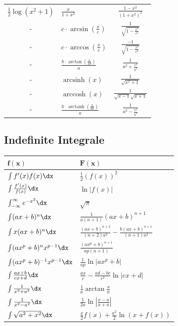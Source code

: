 \begin{flushleft}
\begin{center}
\begin{tabularx}{\linewidth}{c>{\centering\arraybackslash}Xc}
 $\frac{1}{2} \log \left(x^2+1\right)$  & $\frac{x}{1+x^2}$ & $\frac{1-x^2}{\left(1+x^2\right)^2}$
  \\
- &$c\cdot \arcsin(\frac{x}{c})$& $\frac{1}{\sqrt{1-\frac{x^2}{c^2}}}$ \\
- &$c\cdot \arccos(\frac{x}{c})$& $\frac{-1}{\sqrt{1-\frac{x^2}{c^2}}}$ \\
- &$\frac{b\cdot \arctan(\frac{x}{ab})}{a}$& $\frac{1}{a^2+\frac{x^2}{b^2}}$ \\
- &$\operatorname{arcsinh}(x)$& $\frac{1}{\sqrt{x^2 +1}}$ \\
- &$\operatorname{arccosh}(x)$& $\frac{1}{\sqrt{x-1}\sqrt{x+1}}$ \\
- &$\frac{b\cdot \operatorname{arctanh}(\frac{x}{ab})}{a}$& $\frac{1}{a^2-\frac{x^2}{b^2}}$ \\

  \bottomrule
  \end{tabularx}
\end{center}









\subsection{Indefinite Integrale}
\begin{center}
 \begin{tabularx}{\linewidth}{>{\centering\arraybackslash}X>{\centering\arraybackslash}X}
  \toprule
  $\mathbf{f(x)}$ & $\mathbf{F(x)}$ \\
  \midrule
  $\int f'(x) f(x) \dx$ & $\frac{1}{2}(f(x))^2$ \\
  $\int \frac{f'(x)}{f(x)} \dx$ & $\ln|f(x)|$ \\
  $\int_{-\infty}^\infty e^{-x^2} \dx$ & $\sqrt{\pi}$ \\
  $\int (ax+b)^n \dx$ & $\frac{1}{a(n+1)}(ax+b)^{n+1}$ \\
  $\int x(ax+b)^n \dx$ & $\frac{(ax+b)^{n+2}}{(n+2)a^2} - \frac{b(ax+b)^{n+1}}{(n+1)a^2}$ \\
  $\int (ax^p+b)^n x^{p-1} \dx$ & $\frac{(ax^p+b)^{n+1}}{ap(n+1)}$ \\
  $\int (ax^p + b)^{-1} x^{p-1} \dx$ & $\frac{1}{ap} \ln |ax^p + b|$ \\
  $\int \frac{ax+b}{cx+d} \dx$ & $\frac{ax}{c} - \frac{ad-bc}{c^2} \ln |cx +d|$ \\
  $\int \frac{1}{x^2+a^2} \dx$ & $\frac{1}{a} \arctan \frac{x}{a}$ \\
  $\int \frac{1}{x^2 - a^2} \dx$ & $\frac{1}{2a} \ln\left| \frac{x-a}{x+a} \right|$ \\
  $\int \sqrt{a^2+x^2} \dx $ & $\frac{x}{2}f(x) + \frac{a^2}{2}\ln(x+f(x))$ \\


\end{tabularx}
\end{center}
\end{flushleft}
